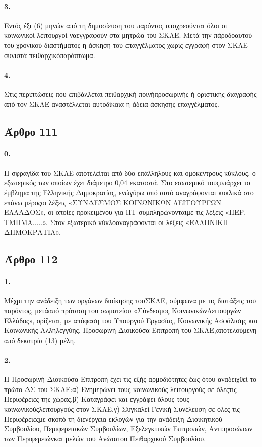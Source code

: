 \documentclass[a4paper,oneside, 10pt]{book}
\begin{document}
\paragraph { 3. } Εντός έξι (6) μηνών από τη δημοσίευση του παρόντος υποχρεούνται όλοι οι κοινωνικοί λειτουργοί ναεγγραφούν στα μητρώα του ΣΚΛΕ. Μετά την πάροδοαυτού του χρονικού διαστήματος η άσκηση του επαγγέλματος χωρίς εγγραφή στον ΣΚΛΕ συνιστά πειθαρχικόπαράπτωμα.
\paragraph { 4. } Στις περιπτώσεις που επιβάλλεται πειθαρχική ποινήπροσωρινής ή οριστικής διαγραφής από τον ΣΚΛΕ αναστέλλεται αυτοδίκαια η άδεια άσκησης επαγγέλματος.
\subsection*{ Άρθρο 111 }
\paragraph { 0. } Η σφραγίδα του ΣΚΛΕ αποτελείται από δύο επάλληλους και ομόκεντρους κύκλους, ο εξωτερικός των οποίων έχει διάμετρο 0,04 εκατοστά. Στο εσωτερικό τουςυπάρχει το έμβλημα της Ελληνικής Δημοκρατίας, ενώγύρω από αυτό αναγράφονται κυκλικά στο επάνω μέροςοι λέξεις «ΣΥΝΔΕΣΜΟΣ ΚΟΙΝΩΝΙΚΩΝ ΛΕΙΤΟΥΡΓΩΝ ΕΛΛΑΔΟΣ», οι οποίες προκειμένου για ΠΤ συμπληρώνονταιμε τις λέξεις «ΠΕΡ. ΤΜΗΜΑ.....». Στον εξωτερικό κύκλοαναγράφονται οι λέξεις «ΕΛΛΗΝΙΚΗ ΔΗΜΟΚΡΑΤΙΑ».
\subsection*{ Άρθρο 112 }
\paragraph { 1. } Μέχρι την ανάδειξη των οργάνων διοίκησης τουΣΚΛΕ, σύμφωνα με τις διατάξεις του παρόντος, μετάαπό πρόταση του σωματείου «Σύνδεσμος ΚοινωνικώνΛειτουργών Ελλάδος», ορίζεται, με απόφαση του Υπουργού Εργασίας, Κοινωνικής Ασφάλισης και Κοινωνικής Αλληλεγγύης, Προσωρινή Διοικούσα Επιτροπή του ΣΚΛΕ,αποτελούμενη από δεκατρία (13) μέλη.
\paragraph { 2. } Η Προσωρινή Διοικούσα Επιτροπή έχει τις εξής αρμοδιότητες έως ότου αναδειχθεί το πρώτο ΔΣ του ΣΚΛΕ:α) Ενημερώνει τους κοινωνικούς λειτουργούς σε όλεςτις Περιφέρειες της χώρας.β) Καταγράφει και εγγράφει όλους τους κοινωνικούςλειτουργούς στον ΣΚΛΕ.γ) Συγκαλεί Γενική Συνέλευση σε όλες τις Περιφέρειεςμε σκοπό τη διενέργεια εκλογών για την ανάδειξη Διοικητικού Συμβουλίου, Περιφερειακών Συμβουλίων, Εξελεγκτικών Επιτροπών, Αντιπροσώπων των Περιφερειώνκαι μελών του Ανώτατου Πειθαρχικού Συμβουλίου.
\end{document}
